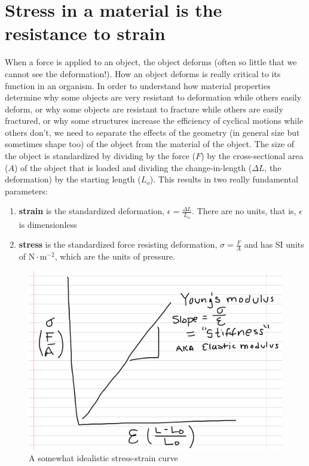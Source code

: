 \documentclass[]{book}
\providecommand{\tightlist}{%
  \setlength{\itemsep}{0pt}\setlength{\parskip}{0pt}}
\begin{document}
\section{Stress in a material is the resistance to
strain}\label{stress-in-a-material-is-the-resistance-to-strain}

When a force is applied to an object, the object deforms (often so
little that we cannot see the deformation!). How an object deforms is
really critical to its function in an organism. In order to understand
how material properties determine why some objects are very resistant to
deformation while others easily deform, or why some objects are
resistant to fracture while others are easily fractured, or why some
structures increase the efficiency of cyclical motions while others
don't, we need to separate the effects of the geometry (in general size
but sometimes shape too) of the object from the material of the object.
The size of the object is standardized by dividing by the force (\(F\))
by the cross-sectional area (\(A\)) of the object that is loaded and
dividing the change-in-length (\(\Delta L\), the deformation) by the
starting length (\(L_o\)). This results in two really fundamental
parameters:

\begin{enumerate}
\def\labelenumi{\arabic{enumi}.}
\tightlist
\item
  \textbf{strain} is the standardized deformation,
  \(\epsilon = \frac{\Delta L}{L_o}\). There are no units, that is,
  \(\epsilon\) is dimensionless
\item
  \textbf{stress} is the standardized force resisting deformation,
  \(\sigma = \frac{F}{A}\) and has SI units of
  \(\textrm{N} \cdot \textrm{m}^{-2}\), which are the units of pressure.
\end{enumerate}

\begin{figure}
\centering
\includegraphics{images/materials_chapter/stress-strain.png}
\caption{\label{fig:unnamed-chunk-7}A somewhat idealistic stress-strain
curve}
\end{figure}
\end{document}
